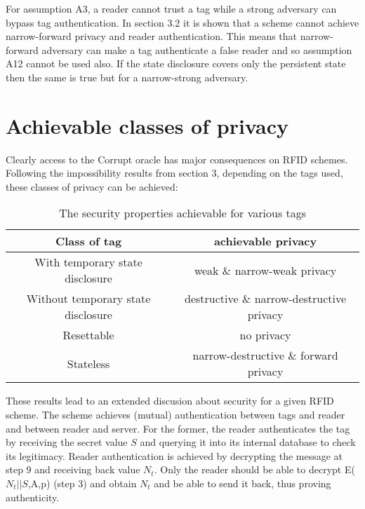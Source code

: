     For assumption A3, a reader cannot trust a tag while a strong adversary can bypass tag authentication. In section 3.2 it is shown 
    that a scheme cannot
    achieve narrow-forward privacy and reader authentication. This means that narrow-forward adversary can make a tag authenticate
    a false reader and so assumption A12 cannot be used also. If the state disclosure covers only the persistent state then the same is
    true but for a narrow-strong adversary.

\section{Achievable classes of privacy}

    Clearly access to the Corrupt oracle has major consequences on RFID schemes. Following the impossibility results from section 3, 
    depending on the tags used, these classes of privacy can be achieved:

    \begin{table}[H]
    \centering
    \caption{The security properties achievable for various tags}
    \begin{tabular}{| c | c |}
        \hline
        Class of tag & achievable privacy \\
        \hline
        With temporary state disclosure & weak \& narrow-weak privacy\\
        Without temporary state disclosure & destructive \& narrow-destructive privacy\\
        Resettable & no privacy \\
        Stateless & narrow-destructive \& forward privacy \\
        \hline
    \end{tabular}
    \end{table}

    These results lead to an extended discusion about security for a given RFID scheme. The \cite{BOM} scheme achieves (mutual)
    authentication between tags and reader and between reader and server. For the former, the reader authenticates the tag by
    receiving the secret value $S$ and querying it into its internal database to check its legitimacy. Reader authentication is
    achieved by decrypting the message at step 9 and receiving back value $N_t$. Only the reader should be able to decrypt 
    E($N_t||S$,A,p) (step 3) and obtain $N_t$ and be able to send it back, thus proving authenticity.
    
